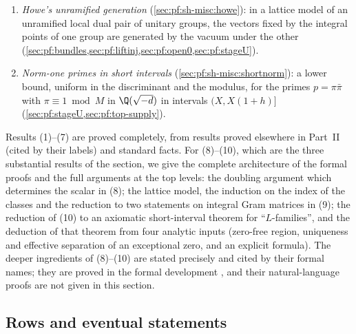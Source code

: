 \begin{enumerate}[label=(\arabic*)]
Weil representation on the Fock model, with the scalar shift $\frac{m_w}2\tr Y_w$ determined by a doubling argument
(\cref{sec:pf:thmK,sec:pf:tlift}).
\item \emph{Howe's unramified generation} (\cref{sec:pf:sh-misc:howe}): in a lattice model of an unramified local dual pair of unitary
groups, the vectors fixed by the integral points of one group are generated by the vacuum under the other
(\cref{sec:pf:bundles,sec:pf:liftinj,sec:pf:open0,sec:pf:stageU}).
\item \emph{Norm-one primes in short intervals} (\cref{sec:pf:sh-misc:shortnorm}): a lower bound, uniform in the discriminant and the
modulus, for the primes $p=\pi\bar\pi$ with $\pi\equiv1\bmod M$ in $\Q(\sqrt{-d})$ in intervals $(X,X(1+h)]$
(\cref{sec:pf:stageU,sec:pf:top-supply}).
\end{enumerate}
Results (1)--(7) are proved completely, from results proved elsewhere in Part~II (cited by their labels) and standard facts. For (8)--(10),
which are the three substantial results of the section, we give the complete architecture of the formal proofs and the full arguments at the
top levels: the doubling argument which determines the scalar in (8); the lattice model, the induction on the index of the classes and the
reduction to two statements on integral Gram matrices in (9); the reduction of (10) to an axiomatic short-interval theorem for
``$L$-families'', and the deduction of that theorem from four analytic inputs (zero-free region, uniqueness and effective separation of an
exceptional zero, and an explicit formula). The deeper ingredients of (8)--(10) are stated precisely and cited by their formal names; they
are proved in the formal development \cite{LeanSource2026}, and their natural-language proofs are not given in this section.

\subsection{Rows and eventual statements}\label{sec:pf:sh-misc:rows}

